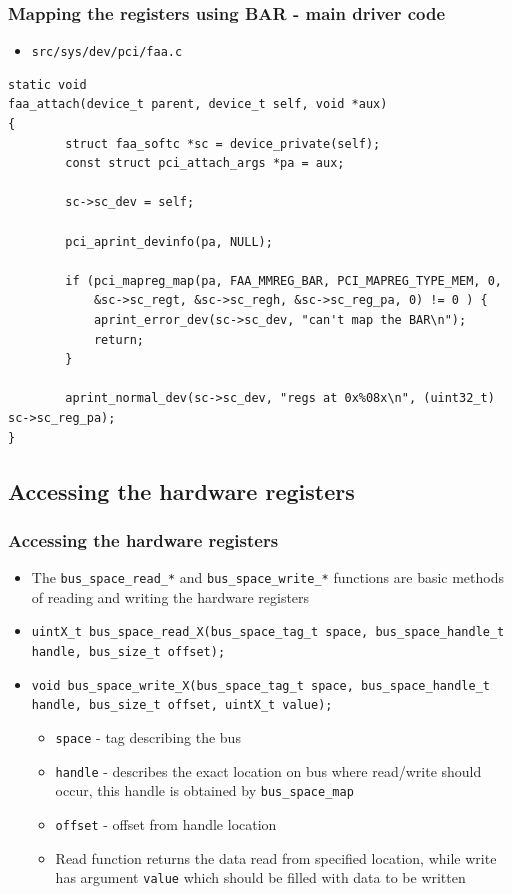 \documentclass[dvipsnames,table]{beamer}
\begin{document}
\begin{frame}[fragile]
\frametitle{Mapping the registers using BAR - main driver code}
\scriptsize
\begin{itemize}
	\item {\tt src/sys/dev/pci/faa.c}
\end{itemize}
\begin{lstlisting}
static void
faa_attach(device_t parent, device_t self, void *aux)
{
        struct faa_softc *sc = device_private(self);
        const struct pci_attach_args *pa = aux;

        sc->sc_dev = self;

        pci_aprint_devinfo(pa, NULL);

        if (pci_mapreg_map(pa, FAA_MMREG_BAR, PCI_MAPREG_TYPE_MEM, 0, 
            &sc->sc_regt, &sc->sc_regh, &sc->sc_reg_pa, 0) != 0 ) {
            aprint_error_dev(sc->sc_dev, "can't map the BAR\n");
            return;
        }

        aprint_normal_dev(sc->sc_dev, "regs at 0x%08x\n", (uint32_t) sc->sc_reg_pa);
}
\end{lstlisting}
\end{frame}

\subsection{Accessing the hardware registers}

\begin{frame}
\frametitle{Accessing the hardware registers}
\begin{itemize}
	\item The {\tt bus\_space\_read\_*} and {\tt bus\_space\_write\_*} functions are basic methods of reading and writing the hardware registers
	\item {\tt uintX\_t bus\_space\_read\_X(bus\_space\_tag\_t space, bus\_space\_handle\_t handle, bus\_size\_t offset);}
	\item {\tt void bus\_space\_write\_X(bus\_space\_tag\_t space, bus\_space\_handle\_t handle, bus\_size\_t offset, uintX\_t value);}
	\begin{itemize}
		\item {\tt space} - tag describing the bus
		\item {\tt handle} - describes the exact location on bus where read/write should occur, this handle is obtained by {\tt bus\_space\_map}
		\item {\tt offset} - offset from handle location
		\item Read function returns the data read from specified location, while write has argument {\tt value} which should be filled with data to be written
	\end{itemize}
\end{itemize}
\end{frame}
\end{document}

